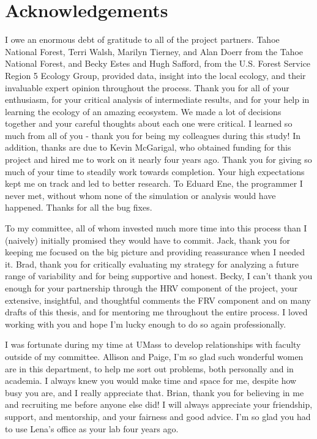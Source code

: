 
\section*{Acknowledgements}

I owe an enormous debt of gratitude to all of the project partners.  Tahoe National Forest, Terri Walsh, Marilyn Tierney, and Alan Doerr from the Tahoe National Forest, and Becky Estes and Hugh Safford, from the U.S. Forest Service Region 5 Ecology Group, provided data, insight into the local ecology, and their invaluable expert opinion throughout the process. Thank you for all of your enthusiasm, for your critical analysis of intermediate results, and for your help in learning the ecology of an amazing ecosystem. We made a lot of decisions together and your careful thoughts about each one were critical. I learned so much from all of you - thank you for being my colleagues during this study! In addition, thanks are due to Kevin McGarigal, who obtained funding for this project and hired me to work on it nearly four years ago. Thank you for giving so much of your time to steadily work towards completion. Your high expectations kept me on track and led to better research. To Eduard Ene, the programmer I never met, without whom none of the simulation or analysis would have happened. Thanks for all the bug fixes.

To my committee, all of whom invested much more time into this process than I (naively) initially promised they would have to commit. Jack, thank you for keeping me focused on the big picture and providing reassurance when I needed it. Brad, thank you for critically evaluating my strategy for analyzing a future range of variability and for being supportive and honest. Becky, I can't thank you enough for your partnership through the HRV component of the project, your extensive, insightful, and thoughtful comments the FRV component and on many drafts of this thesis, and for mentoring me throughout the entire process. I loved working with you and hope I'm lucky enough to do so again professionally.

I was fortunate during my time at UMass to develop relationships with faculty outside of my committee. Allison and Paige, I'm so glad such wonderful women are in this department, to help me sort out problems, both personally and in academia. I always knew you would make time and space for me, despite how busy you are, and I really appreciate that. Brian, thank you for believing in me and recruiting me before anyone else did! I will always appreciate your friendship, support, and mentorship, and your fairness and good advice. I'm so glad you had to use Lena's office as your lab four years ago.

